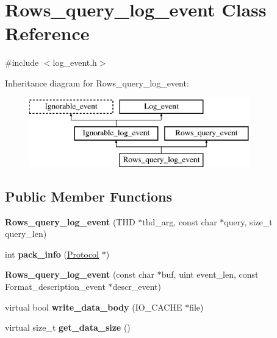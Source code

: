\hypertarget{classRows__query__log__event}{}\section{Rows\+\_\+query\+\_\+log\+\_\+event Class Reference}
\label{classRows__query__log__event}


{\ttfamily \#include $<$log\+\_\+event.\+h$>$}

Inheritance diagram for Rows\+\_\+query\+\_\+log\+\_\+event\+:\begin{figure}[H]
\begin{center}
\leavevmode
\includegraphics[height=3.000000cm]{classRows__query__log__event}
\end{center}
\end{figure}
\subsection*{Public Member Functions}
\begin{DoxyCompactItemize}
\item 
\mbox{\label{classRows__query__log__event_af0388151504fe64fca73cde3a52f5d5e}} 
{\bfseries Rows\+\_\+query\+\_\+log\+\_\+event} (T\+HD $\ast$thd\+\_\+arg, const char $\ast$query, size\+\_\+t query\+\_\+len)
\item 
\mbox{\label{classRows__query__log__event_a775cdc2b14ccbec5affa9622eb8befc4}} 
int {\bfseries pack\+\_\+info} (\mbox{\hyperlink{classProtocol}{Protocol}} $\ast$)
\item 
\mbox{\label{classRows__query__log__event_ab2582c682b2b98e741471c8948edfddd}} 
{\bfseries Rows\+\_\+query\+\_\+log\+\_\+event} (const char $\ast$buf, uint event\+\_\+len, const Format\+\_\+description\+\_\+event $\ast$descr\+\_\+event)
\item 
\mbox{\label{classRows__query__log__event_a9bf05b008f37df63ea29ccc3418668ef}} 
virtual bool {\bfseries write\+\_\+data\+\_\+body} (I\+O\+\_\+\+C\+A\+C\+HE $\ast$file)
\item 
\mbox{\label{classRows__query__log__event_a998433321881ae797f4116e15010f61c}} 
virtual size\+\_\+t {\bfseries get\+\_\+data\+\_\+size} ()
\end{DoxyCompactItemize}
